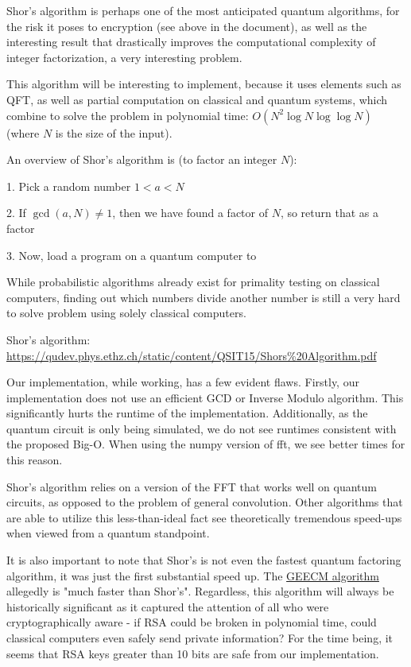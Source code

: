 \documentclass[a4paper,11pt]{article}
\theoremstyle{mytheor}
\begin{document}
Shor's algorithm is perhaps one of the most anticipated quantum algorithms, for the risk it poses to encryption (see above in the document), as well as the interesting result that drastically improves the computational complexity of integer factorization, a very interesting problem.

This algorithm will be interesting to implement, because it uses elements such as QFT, as well as partial computation on classical and quantum systems, which combine to solve the problem in polynomial time: $O(N^2 \log N \log \log N)$ (where $N$ is the size of the input).

An overview of Shor's algorithm is (to factor an integer $N$):

1. Pick a random number $1 < a < N$

2. If $\gcd(a, N) \neq 1$, then we have found a factor of $N$, so return that as a factor

3. Now, load a program on a quantum computer to 


While probabilistic algorithms already exist for primality testing on classical computers, finding out which numbers divide another number is still a very hard to solve problem using solely classical computers.

Shor's algorithm: \href{https://qudev.phys.ethz.ch/static/content/QSIT15/Shors\%20Algorithm.pdf}{https://qudev.phys.ethz.ch/static/content/QSIT15/Shors\%20Algorithm.pdf}

Our implementation, while working, has a few evident flaws. Firstly, our implementation does not use an efficient GCD or Inverse Modulo algorithm. This significantly hurts the runtime of the implementation. Additionally, as the quantum circuit is only being simulated, we do not see runtimes consistent with the proposed Big-O. When using the numpy version of fft, we see better times for this reason.

Shor's algorithm relies on a version of the FFT that works well on quantum circuits, as opposed to the problem of general convolution. Other algorithms that are able to utilize this less-than-ideal fact see theoretically tremendous speed-ups when viewed from a quantum standpoint.

It is also important to note that Shor's is not even the fastest quantum factoring algorithm, it was just the first substantial speed up. The \href{https://eprint.iacr.org/2017/351.pdf}{GEECM algorithm} allegedly is "much faster than Shor's". Regardless, this algorithm will always be historically significant as it captured the attention of all who were cryptographically aware - if RSA could be broken in polynomial time, could classical computers even safely send private information? For the time being, it seems that RSA keys greater than 10 bits are safe from our implementation.
\end{document}
